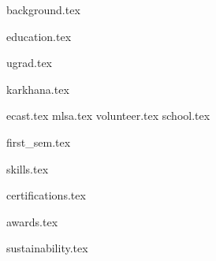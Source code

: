 \documentclass[12pt]{article}
\begin{document}
{background.tex}

{education.tex}

{ugrad.tex}

{karkhana.tex}

{ecast.tex}
{mlsa.tex}
{volunteer.tex}
{school.tex}

{first_sem.tex}

{skills.tex}

{certifications.tex}

{awards.tex}

{sustainability.tex}
\end{document}
